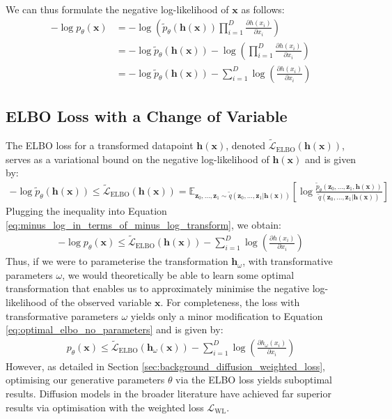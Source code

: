 \documentclass[ oneside,%
                    author={George Herbert},
                    degree={MSci},
                     title={Diffusion Models for Time-Evolving Precipitation Fields},
                  subtitle={}]{dissertation}
\begin{document}
We can thus formulate the negative log-likelihood of $\mathbf{x}$ as follows:
\begin{align}
      -\log p_\theta(\mathbf{x}) &= -\log \left(\tilde{p}_\theta(\mathbf{h}(\mathbf{x}))\prod_{i=1}^D\frac{\partial h(x_i)}{\partial x_i}\right)\\
      &= -\log \tilde{p}_\theta(\mathbf{h}(\mathbf{x})) - \log\left(\prod_{i=1}^D\frac{\partial h(x_i)}{\partial x_i}\right)\\
      &= -\log \tilde{p}_\theta(\mathbf{h}(\mathbf{x})) - \sum_{i=1}^D \log \left(\frac{\partial h(x_i)}{\partial x_i}\right)\label{eq:minus_log_in_terms_of_minus_log_transform}
\end{align}

\subsection{ELBO Loss with a Change of Variable}
\label{sec:results_elbo_change_of_variable}

The ELBO loss for a transformed datapoint $\mathbf{h}(\mathbf{x})$, denoted $\tilde{\mathcal{L}}_{\mathrm{ELBO}}(\mathbf{h}(\mathbf{x}))$, serves as a variational bound on the negative log-likelihood of $\mathbf{h}(\mathbf{x})$ and is given by:
\begin{align}
      -\log \tilde{p}_\theta(\mathbf{h}(\mathbf{x}))\le \tilde{\mathcal{L}}_{\mathrm{ELBO}}(\mathbf{h}(\mathbf{x})) = \mathbb{E}_{\mathbf{z}_0,\ldots,\mathbf{z}_1\sim\tilde{q}(\mathbf{z}_0,\ldots,\mathbf{z}_1|\mathbf{h}(\mathbf{x}))} \left[\log \frac{\tilde{p}_\theta(\mathbf{z}_0,\ldots,\mathbf{z}_1,\mathbf{h}(\mathbf{x}))}{\tilde{q}(\mathbf{z}_0,\ldots,\mathbf{z}_1|\mathbf{h}(\mathbf{x}))}\right]
\end{align}
Plugging the inequality into Equation \ref{eq:minus_log_in_terms_of_minus_log_transform}, we obtain:
\begin{align}
      -\log p_\theta(\mathbf{x})\le \tilde{\mathcal{L}}_{\mathrm{ELBO}}(\mathbf{h}(\mathbf{x})) - \sum_{i=1}^D \log \left(\frac{\partial h(x_i)}{\partial x_i}\right)\label{eq:optimal_elbo_no_parameters}
\end{align}
Thus, if we were to parameterise the transformation $\mathbf{h}_\omega$, with transformative parameters $\omega$, we would theoretically be able to learn some optimal transformation that enables us to approximately minimise the negative log-likelihood of the observed variable $\mathbf{x}$. For completeness, the loss with transformative parameters $\omega$ yields only a minor modification to Equation \ref{eq:optimal_elbo_no_parameters} and is given by:
\begin{align}
      p_\theta(\mathbf{x}) \le \tilde{\mathcal{L}}_{\mathrm{ELBO}}(\mathbf{h}_\omega(\mathbf{x})) - \sum_{i=1}^D \log \left(\frac{\partial h_\omega(x_i)}{\partial x_i}\right)\label{eq:optimal_elbo_parameters}
\end{align}
However, as detailed in Section \ref{sec:background_diffusion_weighted_loss}, optimising our generative parameters $\theta$ via the ELBO loss yields suboptimal results. Diffusion models in the broader literature have achieved far superior results via optimisation with the weighted loss $\mathcal{L}_{\mathrm{WL}}$.
\end{document}

